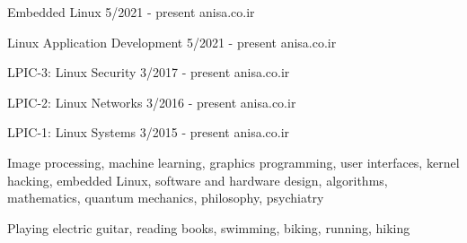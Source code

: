 \documentclass[a4paper,12pt]{memoir} %
\begin{document}


{Embedded Linux}
{5/2021 - present}
{}
{anisa.co.ir}


{Linux Application Development}
{5/2021 - present}
{}
{anisa.co.ir}


{LPIC-3: Linux Security}
{3/2017 - present}
{}
{anisa.co.ir}


{LPIC-2: Linux Networks}
{3/2016 - present}
{}
{anisa.co.ir}


{LPIC-1: Linux Systems}
{3/2015 - present}
{}
{anisa.co.ir}


\Sep %




{Image processing, machine learning, graphics programming, user interfaces, kernel hacking, embedded Linux, software and hardware design, algorithms, mathematics, quantum mechanics, philosophy, psychiatry}


{Playing electric guitar, reading books, swimming, biking, running, hiking}


\Sep %

\end{document}
